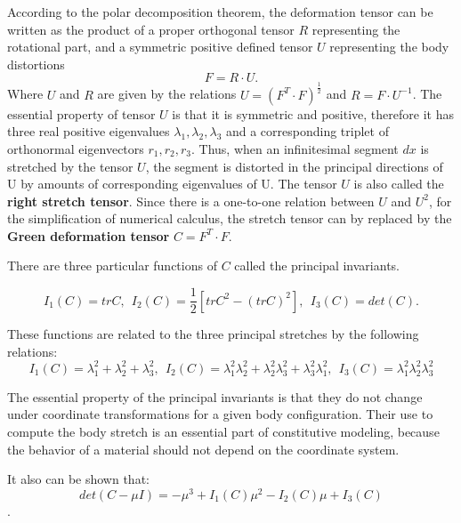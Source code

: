 According to the polar decomposition theorem, the deformation tensor can be written as the product of a proper orthogonal tensor $R$ representing the rotational part, and a symmetric positive defined tensor $U$ representing the body distortions 
\begin{equation}
F = R \cdot U.
\end{equation}
Where $U$ and $R$ are given by the relations $U = (F^T \cdot F)^ {\frac{1}{2}} $ and $R = F \cdot U^{-1}$. The essential property of tensor $U$ is that it is symmetric and positive, therefore it has three real positive eigenvalues
$\lambda_1, \lambda_2, \lambda_3$ and a corresponding triplet of orthonormal eigenvectors $r_1, r_2, r_3$. Thus, when an infinitesimal segment $dx$ is stretched by the tensor $U$, the segment is distorted in the principal directions of U by amounts of corresponding eigenvalues of U. The tensor $U$ is also called the \textbf{right stretch tensor}.  Since there is a one-to-one relation between $U$ and $U^2$, for the simplification of numerical calculus, the stretch tensor can by replaced by the \textbf{Green deformation tensor} $C = F^T \cdot F$.



There are three particular functions of $C$ called the principal invariants. 

\begin{equation}
\label{principal_invariants}
I_1(C) = tr C, \ \ I_2(C)=\frac{1}{2}\left[ trC^2 - \left(tr C \right)^2 \right], \ \ I_3(C)=det(C) .
\end{equation} 

These functions are related to the three principal stretches by the following relations:
\begin{equation}
\label{principalstrechinvariantsrelation}
I_1(C) = \lambda_1^2+\lambda_2^2+\lambda_3^2, \ \ I_2(C) = \lambda_1^2 \lambda_2^2 + \lambda_2^2 \lambda_3^2+ \lambda_3^2 \lambda_1^2, \ \ I_3(C) = \lambda_1^2 \lambda_2^2 \lambda_3^2
\end{equation}

The essential property of the principal invariants is that they do not change under coordinate transformations for a given body configuration. Their use to compute the body stretch is an essential part of constitutive modeling, because the behavior of a material should not depend on the coordinate system.

It also can be shown that:
\begin{equation}
\label{eq:detinvariantrelation}
det(C-\mu I) = -\mu ^3+I_1(C)\mu ^2-I_2(C)\mu +I_3(C)
\end{equation}. 



